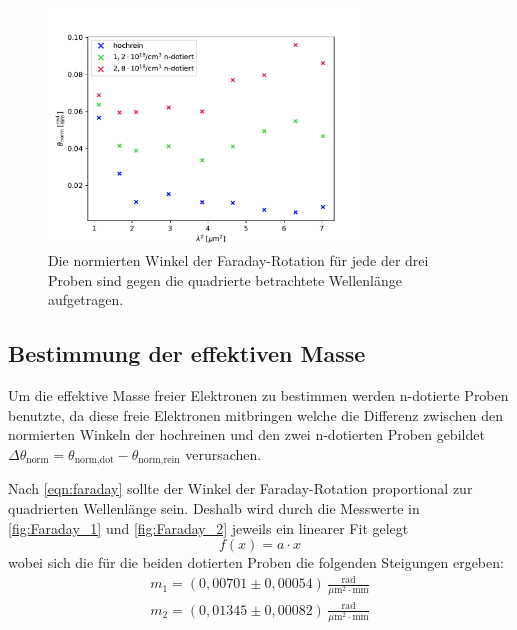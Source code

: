         \begin{figure}[h]
            \centering
            \includegraphics[width = 0.75\textwidth]{plots/Winkel_normiert.pdf}
            \caption{Die normierten Winkel der Faraday-Rotation für jede der drei Proben sind gegen die quadrierte betrachtete Wellenlänge aufgetragen.}
            \label{fig:Winkel_normiert}
        \end{figure}

        \FloatBarrier

    \subsection{Bestimmung der effektiven Masse}
        Um die effektive Masse freier Elektronen zu bestimmen werden n-dotierte Proben benutzte, da diese freie Elektronen mitbringen welche die Differenz zwischen den normierten Winkeln der hochreinen und den zwei n-dotierten Proben gebildet $\Delta \theta_{\text{norm}} = \theta_{\text{norm,dot}} - \theta_{\text{norm,rein}}$ verursachen.

        Nach \eqref{eqn:faraday} sollte der Winkel der Faraday-Rotation proportional zur quadrierten Wellenlänge sein.
        Deshalb wird durch die Messwerte in \autoref{fig:Faraday_1} und \autoref{fig:Faraday_2} jeweils ein linearer Fit gelegt
        \begin{equation*}
            f(x) = a \cdot x
        \end{equation*}
        wobei sich die für die beiden dotierten Proben die folgenden Steigungen ergeben:
        \begin{align*}
            m_1 = (0,00701 \pm 0,00054) \, \frac{\text{rad}}{\mu \text{m}^2 \cdot \text{mm}} \\[7pt]
            m_2 = (0,01345 \pm 0,00082) \, \frac{\text{rad}}{\mu \text{m}^2 \cdot \text{mm}}
        \end{align*}
    
